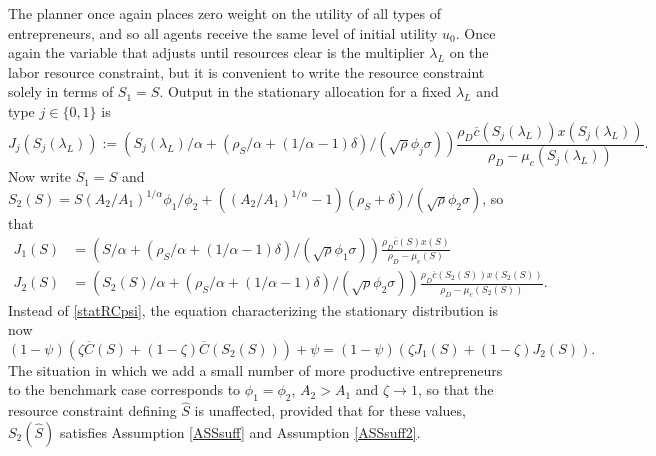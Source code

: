 \documentclass[11pt]{article}
\theoremstyle{plain}
\theoremstyle{definition} %
\begin{document}
The planner once again places zero weight on the utility of all types of entrepreneurs, and so all agents receive the same level of initial utility $u_0$. Once again the variable that adjusts until resources clear is the multiplier $\lambda_L$ on the labor resource constraint, but it is convenient to write the resource constraint solely in terms of $S_1 = S$. Output in the stationary allocation for a fixed $\lambda_L$ and type $j \in \{0,1\}$ is
$$
J_j(S_j(\lambda_L)) := {\left(S_j(\lambda_L)/\alpha + (\rho_S/\alpha + (1/\alpha-1)\delta)/(\sqrt{\rho} \phi_j \sigma) \right)}\frac{\rho_D\overline{c}(S_j(\lambda_L))x(S_j(\lambda_L))}{\rho_D - \mu_c(S_j(\lambda_L))}.
$$ 
Now write $S_1 = S$ and $S_2(S) = S(A_2/A_1)^{1/\alpha}\phi_1/\phi_2 + ((A_2/A_1)^{1/\alpha}-1)(\rho_S + \delta)/(\sqrt{\rho}\phi_2\sigma)$, so that
\begin{align*}
J_1(S) & = {\left(S/\alpha + (\rho_S/\alpha + (1/\alpha - 1)\delta)/(\sqrt{\rho}\phi_1\sigma) \right)}\frac{\rho_D\overline{c}(S)x(S)}{\rho_D - \mu_c(S)} 
\\ J_2(S) & = {\left(S_2(S)/\alpha + (\rho_S/\alpha + (1/\alpha - 1)\delta)/(\sqrt{\rho} \phi_2 \sigma) \right)}
 \frac{\rho_D\overline{c}(S_2(S))x(S_2(S))}{\rho_D - \mu_c(S_2(S))}.
\end{align*}
Instead of \eqref{statRCpsi}, the equation characterizing the stationary distribution is now
\begin{equation}
(1-\psi)(\zeta \overline{C}(S) + (1-\zeta)\overline{C}(S_2(S))) + \psi = (1-\psi)(\zeta J_1(S) + (1 - \zeta) J_2(S)).
\label{statRCpsi3}
\end{equation}
The situation in which we add a small number of more productive entrepreneurs to the benchmark case corresponds to $\phi_1 = \phi_2$, $A_2 > A_1$ and $\zeta \rightarrow 1$, so that the resource constraint defining $\hat{S}$ is unaffected, provided that for these values, $S_2(\hat{S})$ satisfies Assumption \ref{ASSsuff} and Assumption \ref{ASSsuff2}.

\end{document}
